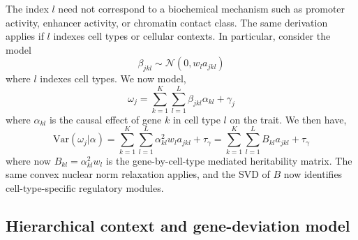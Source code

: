 \documentclass[11pt]{article}
\begin{document}
The index $l$ need not correspond to a biochemical mechanism such as promoter activity, enhancer activity, or chromatin contact class. The same derivation applies if $l$ indexes cell types or cellular contexts. In particular, consider the model
\begin{equation}
    \beta_{jkl} \sim \mathcal{N}(0, w_l a_{jkl})
\end{equation}
where $l$ indexes cell types. We now model, 
\begin{equation}
    \omega_j = \sum_{k=1}^K \sum_{l=1}^L \beta_{jkl} \alpha_{kl} + \gamma_j
\end{equation}
where $\alpha_{kl}$ is the causal effect of gene $k$ in cell type $l$ on the trait. 
We then have,
\begin{equation}
    \text{Var}(\omega_j|\alpha) = \sum_{k=1}^K \sum_{l=1}^L \alpha_{kl}^2 w_l a_{jkl} + \tau_\gamma = \sum_{k=1}^K \sum_{l=1}^L B_{kl} a_{jkl} + \tau_\gamma
\end{equation}
where now $B_{kl} = \alpha_{kl}^2 w_l$ is the gene-by-cell-type mediated heritability matrix. The same convex nuclear norm relaxation applies, and the SVD of $B$ now identifies cell-type-specific regulatory modules.

\subsection{Hierarchical context and gene-deviation model}
\end{document}
